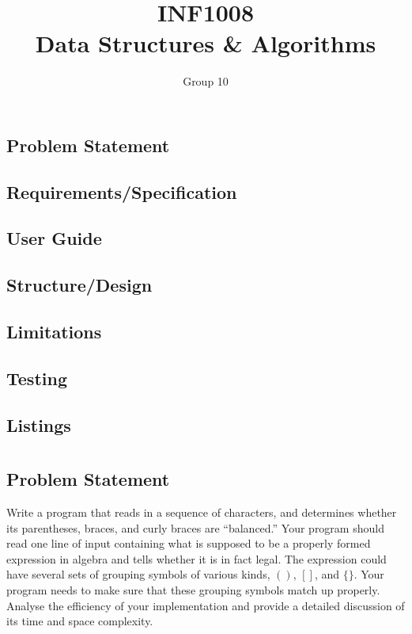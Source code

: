 \documentclass{report}
\title{\Huge{INF1008}\\Data Structures \& Algorithms}
\author{\huge{Group 10}}
\date{}
\begin{document}
\maketitle
\newpage%
\tableofcontents
\pagebreak
\chapter{}
\section{Problem Statement}
\section{Requirements/Specification}
\section{User Guide}
\section{Structure/Design}
\section{Limitations}
\section{Testing}
\section{Listings}
\chapter{}
\section{Problem Statement}
Write a program that reads in a sequence of characters, and determines whether its parentheses, braces, and curly braces are ``balanced.'' Your program should read one line of input containing what is supposed to be a properly formed expression in algebra and tells whether it is in fact legal. The expression could have several sets of grouping symbols of various kinds, \(()\), \([]\), and \(\{\}\). Your program needs to make sure that these grouping symbols match up properly. Analyse the efficiency of your implementation and provide a detailed discussion of its time and space complexity.
\end{document}
